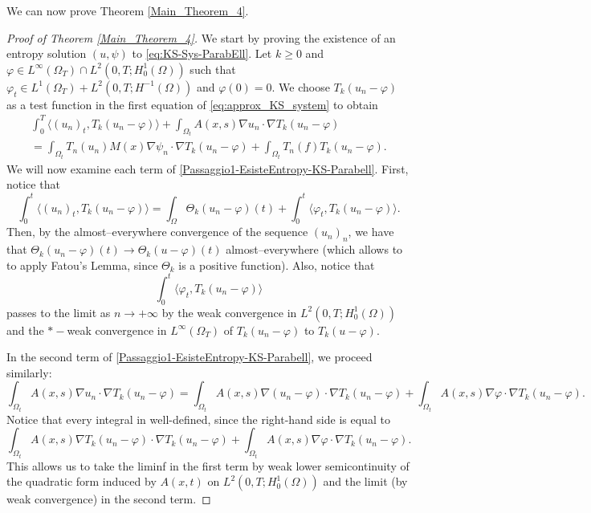\documentclass{amsart}
\numberwithin{equation}{section}
\def\elle#1{L^{#1}}
\def\elleomT#1{L^{#1}(\Omega_T)}
\def\Hom{H^1_0(\Omega)}
\def\io{\int_\Omega}
\def\iot{\int_{\Omega_t}}
\begin{document}
We can now prove Theorem \ref{Main_Theorem_4}. 
\begin{proof}[Proof of Theorem \ref{Main_Theorem_4}]
We start by proving the existence of an entropy solution $(u,\psi)$ to \eqref{eq:KS-Sys-ParabEll}. 
    Let $k\geq 0$ and $\varphi\in\elleomT\infty\cap\elle2(0,T;\Hom)$ such that $\varphi_t\in \elleomT 1+ \elle2(0,T;H^{-1}(\Omega))$ and $\varphi(0)=0$. We choose $T_k(u_n-\varphi)$ as a test function in the first equation of \eqref{eq:approx_KS_system} to obtain
    \begin{multline}\label{Passaggio1-EsisteEntropy-KS-Parabell}
        \int_0^T\langle (u_n)_t,T_k(u_n-\varphi)\rangle + \iot A(x,s)\nabla u_n\cdot \nabla T_k(u_n-\varphi) \\
        =\iot T_n(u_n) M(x)\nabla \psi_n\cdot\nabla T_k(u_n-\varphi) + \iot T_n(f)T_k(u_n-\varphi).
    \end{multline}
    We will now examine each term of \eqref{Passaggio1-EsisteEntropy-KS-Parabell}. First, notice that 
    $$\int_0^t\langle (u_n)_t,T_k(u_n-\varphi)\rangle=\io \Theta_k(u_n-\varphi)(t)+\int_0^t\langle \varphi_t,T_k(u_n-\varphi)\rangle.$$
    Then, by the almost--everywhere convergence of the sequence $(u_n)_n$, we have that $\Theta_k(u_n-\varphi)(t)\to\Theta_k(u-\varphi)(t)$ almost--everywhere (which allows to to apply Fatou's Lemma, since $\Theta_k$ is a positive function). Also, notice that
    \[\int_0^t\langle \varphi_t,T_k(u_n-\varphi)\rangle\]
    passes to the limit as $n\to+\infty$ by the weak convergence in $\elle2(0,T;\Hom)$ and the $*-$weak convergence in $\elleomT\infty$ of $T_k(u_n-\varphi)$ to $T_k(u-\varphi)$.

    In the second term of \eqref{Passaggio1-EsisteEntropy-KS-Parabell}, we proceed similarly:
    $$
    \iot A(x,s)\nabla u_n\cdot \nabla T_k(u_n-\varphi) = \iot A(x,s)\nabla (u_n-\varphi)\cdot \nabla T_k(u_n-\varphi) + \iot A(x,s)\nabla \varphi\cdot \nabla T_k(u_n-\varphi).
    $$
    Notice that every integral in well-defined, since the right-hand side is equal to 
    $$
    \iot A(x,s)\nabla T_k(u_n-\varphi)\cdot \nabla T_k(u_n-\varphi) + \iot A(x,s)\nabla \varphi\cdot \nabla T_k(u_n-\varphi).
    $$
    This allows us to take the liminf in the first term by weak lower semicontinuity of the quadratic form induced by $A(x,t)$ on $\elle2(0,T;\Hom)$ and the limit (by weak convergence) in the second term.


\end{proof}
\end{document}
